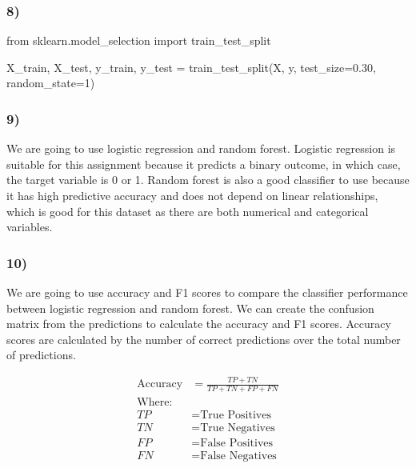 \documentclass[
  11pt,
  letterpaper,
  DIV=11,
  numbers=noendperiod]{scrartcl}
\newenvironment{Shaded}{\begin{snugshade}}{\end{snugshade}}
\newcommand{\DecValTok}[1]{\textcolor[rgb]{0.68,0.00,0.00}{#1}}
\newcommand{\FloatTok}[1]{\textcolor[rgb]{0.68,0.00,0.00}{#1}}
\newcommand{\ImportTok}[1]{\textcolor[rgb]{0.00,0.46,0.62}{#1}}
\newcommand{\NormalTok}[1]{\textcolor[rgb]{0.00,0.23,0.31}{#1}}
\newcommand{\OperatorTok}[1]{\textcolor[rgb]{0.37,0.37,0.37}{#1}}
\begin{document}
\subsubsection{8)}\label{section-7}

\begin{Shaded}
\begin{Highlighting}[]
\ImportTok{from}\NormalTok{ sklearn.model\_selection }\ImportTok{import}\NormalTok{ train\_test\_split}

\NormalTok{X\_train, X\_test, y\_train, y\_test }\OperatorTok{=}\NormalTok{ train\_test\_split(X, y, test\_size}\OperatorTok{=}\FloatTok{0.30}\NormalTok{, random\_state}\OperatorTok{=}\DecValTok{1}\NormalTok{)}
\end{Highlighting}
\end{Shaded}

\subsubsection{9)}\label{section-8}

We are going to use logistic regression and random forest. Logistic
regression is suitable for this assignment because it predicts a binary
outcome, in which case, the target variable is 0 or 1. Random forest is
also a good classifier to use because it has high predictive accuracy
and does not depend on linear relationships, which is good for this
dataset as there are both numerical and categorical variables.

\subsubsection{10)}\label{section-9}

We are going to use accuracy and F1 scores to compare the classifier
performance between logistic regression and random forest. We can create
the confusion matrix from the predictions to calculate the accuracy and
F1 scores. Accuracy scores are calculated by the number of correct
predictions over the total number of predictions.

\begin{align*}
\text{Accuracy} &= \frac{TP + TN}{TP + TN + FP + FN} \\
\text{Where:} \\
TP &= \text{True Positives} \\
TN &= \text{True Negatives} \\
FP &= \text{False Positives} \\
FN &= \text{False Negatives}
\end{align*}
\end{document}
